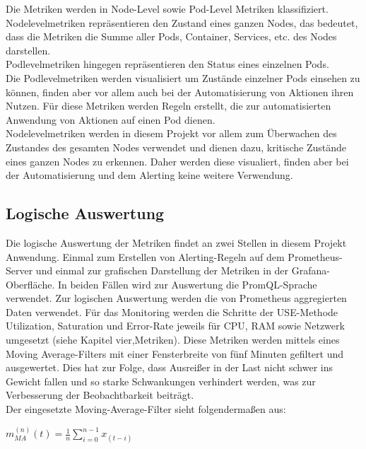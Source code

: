 \documentclass[a4paper,10pt]{scrartcl}
\begin{document}
Die Metriken werden in Node-Level sowie Pod-Level Metriken klassifiziert.\\
Nodelevelmetriken repräsentieren den Zustand eines ganzen Nodes, das bedeutet, dass die Metriken die Summe aller Pods, Container, Services, etc. des Nodes darstellen.\\
Podlevelmetriken hingegen repräsentieren den Status eines einzelnen Pods.\\
Die Podlevelmetriken werden visualisiert um Zustände einzelner Pods einsehen zu können, finden aber vor allem auch bei der Automatisierung von Aktionen ihren Nutzen. Für diese Metriken werden Regeln erstellt, die zur automatisierten Anwendung von Aktionen auf einen Pod dienen.\\
Nodelevelmetriken werden in diesem Projekt vor allem zum Überwachen des Zustandes des gesamten Nodes verwendet und dienen dazu, kritische Zustände eines ganzen Nodes zu erkennen. Daher werden diese visualiert, finden aber bei der Automatisierung und dem Alerting keine weitere Verwendung.

\subsection{Logische Auswertung}

Die logische Auswertung der Metriken findet an zwei Stellen in diesem Projekt Anwendung. Einmal zum Erstellen von Alerting-Regeln auf dem Prometheus-Server und einmal zur grafischen Darstellung der Metriken in der Grafana-Oberfläche. In beiden Fällen wird zur Auswertung die PromQL-Sprache verwendet.
Zur logischen Auswertung werden die von Prometheus aggregierten Daten verwendet. Für das Monitoring werden die Schritte der USE-Methode Utilization, Saturation und Error-Rate jeweils für CPU, RAM sowie Netzwerk umgesetzt (siehe Kapitel vier,Metriken). Diese Metriken werden mittels eines \glqq Moving Average\grqq-Filters mit einer Fensterbreite von fünf Minuten gefiltert und ausgewertet. Dies hat zur Folge, dass Ausreißer in der Last nicht schwer ins Gewicht fallen und so starke Schwankungen verhindert werden, was zur Verbesserung der Beobachtbarkeit beiträgt.\\
Der eingesetzte \glqq Moving-Average\grqq-Filter sieht folgendermaßen aus:\\

\begin{Huge}

\(
\displaystyle{m^{(n)}_{MA}(t) = \frac{1}{n}{\sum\limits_{i=0}^{{n-1}} x_{(t-i)}} }
\)\\

\end{Huge}
\end{document}
